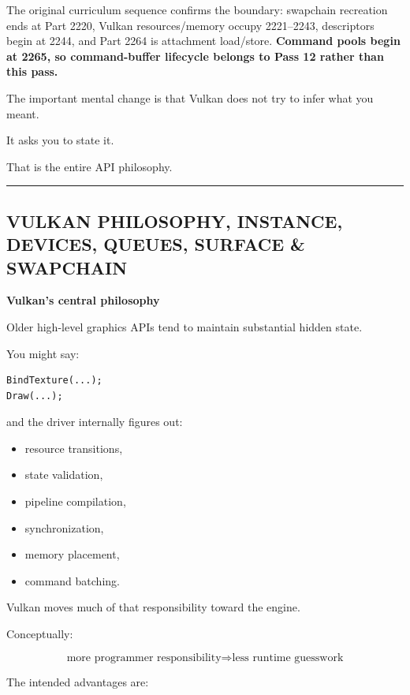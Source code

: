 The original curriculum sequence confirms the boundary: swapchain recreation ends at Part 2220, Vulkan resources/memory occupy 2221--2243, descriptors begin at 2244, and Part 2264 is attachment load/store. \textbf{Command pools begin at 2265, so command-buffer lifecycle belongs to Pass 12 rather than this pass.}

The important mental change is that Vulkan does not try to infer what you meant.

It asks you to state it.

That is the entire API philosophy.

\begin{center}\rule{0.5\linewidth}{0.5pt}\end{center}

\subsection{VULKAN PHILOSOPHY, INSTANCE, DEVICES, QUEUES, SURFACE \& SWAPCHAIN}\label{01-foundations-i-ch013-vulkan-philosophy-instance-devices-queues-surface-swapchain}

\textbf{Vulkan's central philosophy}

Older high-level graphics APIs tend to maintain substantial hidden state.

You might say:

\begin{verbatim}
BindTexture(...);
Draw(...);
\end{verbatim}

and the driver internally figures out:

\begin{itemize}
\tightlist
\item
  resource transitions,
\item
  state validation,
\item
  pipeline compilation,
\item
  synchronization,
\item
  memory placement,
\item
  command batching.
\end{itemize}

Vulkan moves much of that responsibility toward the engine.

Conceptually:

\[
\boxed{
\text{more programmer responsibility}
\Longrightarrow
\text{less runtime guesswork}
}
\]

The intended advantages are:

